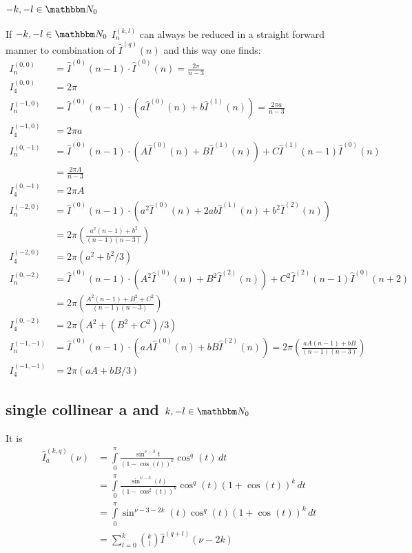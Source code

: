 \documentclass[
  english,		%
  a4paper,		%
  11pt,			%
  DIV=12,
  titlepage,
  toc=bibnumbered,
  parskip=full,  	%
  headings=normal,
  BCOR=12mm,
  numbers=noenddot
]{scrartcl}
\begin{document}
\subsection{$-k,-l\in\mathbbm N_0$}
If $-k,-l\in\mathbbm N_0$ $I_{n}^{(k,l)}$ can always be reduced in a straight forward manner to combination of $\hat I^{(q)}(n)$ and this way one finds\cite[Ch. 5]{Bojak:2000eu}\cite[App. C]{PhysRevD.40.54}:
\begin{align}
I^{(0,0)}_{n} &= \hat I^{(0)}(n-1) \cdot \hat I^{(0)}(n) = \frac{2\pi}{n-3}\\
I^{(0,0)}_{4} &= 2\pi\\
I^{(-1,0)}_{n} &= \hat I^{(0)}(n-1) \cdot (a\hat I^{(0)}(n)+b\hat I^{(1)}(n)) = \frac{2\pi a}{n-3}\\
I^{(-1,0)}_{4} &= 2\pi a \\
I^{(0,-1)}_{n} &= \hat I^{(0)}(n-1) \cdot (A\hat I^{(0)}(n) + B\hat I^{(1)}(n)) + C\hat I^{(1)}(n-1)\hat I^{(0)}(n)\\
 &= \frac{2\pi A}{n-3}\\
I^{(0,-1)}_{4} &=2\pi A\\
I^{(-2,0)}_{n} &= \hat I^{(0)}(n-1) \cdot (a^2\hat I^{(0)}(n)+2ab\hat I^{(1)}(n) + b^2 \hat I^{(2)}(n))\\
 &= 2\pi\left(\frac{a^2(n-1)+b^2}{(n-1)(n-3)}\right)\\
I^{(-2,0)}_{4} &= 2\pi(a^2 + b^2/3) \\
I^{(0,-2)}_{n} &= \hat I^{(0)}(n-1) \cdot (A^2\hat I^{(0)}(n) + B^2\hat I^{(2)}(n)) + C^2\hat I^{(2)}(n-1)\hat I^{(0)}(n+2) \\
 &= 2\pi\left(\frac{A^2(n-1)+B^2+C^2}{(n-1)(n-3)}\right)\\
I^{(0,-2)}_{4} &= 2\pi(A^2+(B^2+C^2)/3) \\
I^{(-1,-1)}_{n} &= \hat I^{(0)}(n-1) \cdot (a A\hat I^{(0)}(n) + b B \hat I^{(2)}(n)) = 2\pi\left(\frac{aA(n-1)+bB}{(n-1)(n-3)}\right)\\
I^{(-1,-1)}_{4} &= 2\pi(aA + bB/3)
\end{align}

\subsection{single collinear a and $k,-l\in \mathbbm N_0$}
It is
\begin{align}
\hat I_{a}^{(k,q)}(\nu) &= \int\limits_0^\pi\!\frac{\sin^{\nu-3}t}{(1-\cos(t))^k}\cos^q(t)\, dt \\
 &= \int\limits_0^\pi\!\frac{\sin^{\nu-3}(t)}{(1-\cos^2(t))^k}\cos^q(t)(1+\cos(t))^k\, dt\\
 &=\int\limits_0^\pi\!\sin^{\nu-3-2k}(t)\cos^q(t)(1+\cos(t))^k\, dt\\
 &= \sum\limits_{l=0}^k\binom{k}{l}\hat I^{(q+l)}(\nu-2k)
\end{align}
\end{document}

